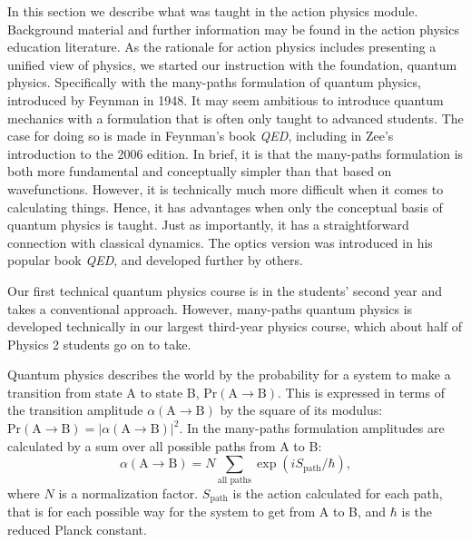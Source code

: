 \documentclass[prb,oncolumn,12pt]{revtex4-2}
\begin{document}
In this section we describe what was taught in the action physics module. Background material and further information may be found in the action physics education literature. \cite{TaylorCIP, Hanc2003, Moore, HancAJP2004a, HancAJP2004b, Ogborn, Neuenschwander} As the rationale for action physics includes presenting a unified view of physics, we started our instruction with the foundation, quantum physics. Specifically with the many-paths formulation of quantum physics, introduced by Feynman in 1948. \cite{FeynmanRMP, FeynmanHibbs} It may seem ambitious to introduce quantum mechanics with a formulation that is often only taught to advanced students. The case for doing so is made in Feynman's book \textit{QED}, including in Zee's introduction to the 2006 edition. \cite{QED} In brief, it is that the many-paths formulation is both more fundamental and conceptually simpler than that based on wavefunctions. However, it is technically much more difficult when it comes to calculating things. Hence, it has advantages when only the conceptual basis of quantum physics is taught. Just as importantly, it has a straightforward connection with classical dynamics. \cite{TaylorCIP, Ogborn, Dirac} The optics version was introduced in his popular book \textit{QED},  \cite{QED} and developed further by others. \cite{deGrooth,Field}

Our first technical quantum physics course is in the students' second year and takes a conventional approach. \cite{Griffiths} However, many-paths quantum physics is developed technically in our largest third-year physics course, which about half of Physics 2 students go on to take.

Quantum physics describes the world by the probability for a system to make a transition from state A to state B, $\textrm{Pr} ( \textrm{A} \rightarrow \textrm{B} )$. This is expressed in terms of the transition amplitude $\alpha ( \textrm{A} \rightarrow \textrm{B} )$ by the square of its modulus: $\textrm{Pr} ( \textrm{A} \rightarrow \textrm{B} ) = | \alpha ( \textrm{A} \rightarrow \textrm{B} ) |^2$. In the many-paths formulation amplitudes are calculated by a sum over all possible paths from A to B: 
%
\begin{equation} \label{amplitude}
\alpha ( \textrm{A} \rightarrow \textrm{B} ) = N \sum_\textrm{all paths} \exp ( i S_\textrm{path} / \hbar ) ,
\end{equation}
%
where $N$ is a normalization factor. $S_\textrm{path}$ is the action calculated for each path, that is for each possible way for the system to get from A to B, and $\hbar$ is the reduced Planck constant. 
\end{document}
